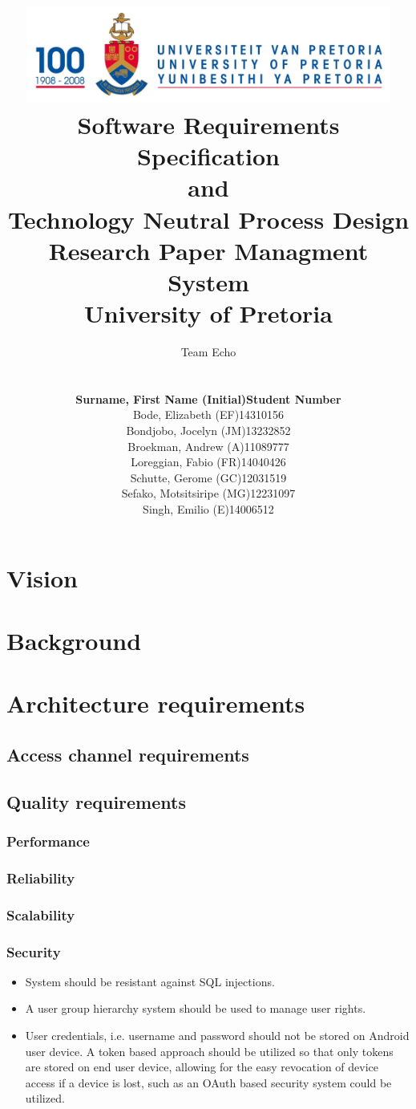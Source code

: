 \documentclass[a4paper,10pt]{article}
\title{\includegraphics[width=12cm]{Eeufeeslogo.jpg} \\
       Software Requirements Specification \\ 
       and \\
       Technology Neutral Process Design \\
       Research Paper Managment System \\
       \vspace{0.5cm}
       University of Pretoria \\
       \vspace{1.0cm}
       }
\date{}
\author{Team Echo\\
	\vspace{0.5cm} \\
	\begin{tabu} to \textwidth { X[l] X[l]}
		\hline
		\textbf{Surname, First Name (Initial)}	& \textbf{Student Number}	\\ \hline \hline
		Bode, Elizabeth (EF)			& 14310156		\\ \hline
		Bondjobo, Jocelyn (JM)		& 13232852		\\ \hline
		Broekman, Andrew (A)		& 11089777		\\ \hline
		Loreggian, Fabio (FR)			& 14040426		\\ \hline
		Schutte, Gerome (GC)		& 12031519		\\ \hline
		Sefako, Motsitsiripe (MG)		& 12231097		\\ \hline
		Singh, Emilio (E)			& 14006512		\\ \hline
		\hline
	\end{tabu}}
\begin{document}
\clearpage
\maketitle
\thispagestyle{empty}

\newpage
{}

\tableofcontents

\newpage
{}

\section{Vision}

\section{Background}

\section{Architecture requirements}
\subsection{Access channel requirements}

\subsection{Quality requirements}
\subsubsection{Performance}

\subsubsection{Reliability}

\subsubsection{Scalability}

\subsubsection{Security}
\begin{itemize}
\item System should be resistant against SQL injections.
\item A user group hierarchy system should be used to manage user rights.
\item User credentials, i.e. username and password should not be stored on Android user device. A token based approach should be utilized so that only tokens are stored on end user device, allowing for the easy revocation of device access if a device is lost, such as an OAuth based security system could be utilized.
\end{itemize}
\end{document}
